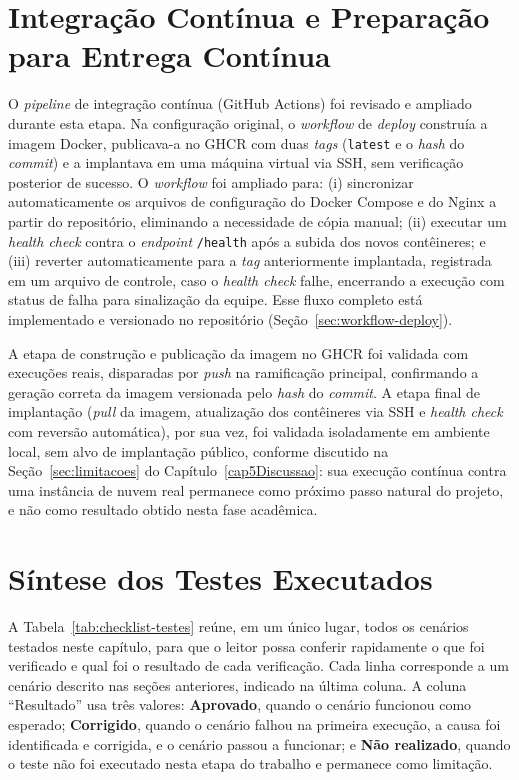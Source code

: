\section{Integração Contínua e Preparação para Entrega Contínua}
\label{sec:ci-cd-resultados}

O \textit{pipeline} de integração contínua (GitHub Actions) foi revisado e ampliado durante esta etapa. Na configuração original, o \textit{workflow} de \textit{deploy} construía a imagem Docker, publicava-a no GHCR com duas \textit{tags} (\texttt{latest} e o \textit{hash} do \textit{commit}) e a implantava em uma máquina virtual via SSH, sem verificação posterior de sucesso. O \textit{workflow} foi ampliado para: (i) sincronizar automaticamente os arquivos de configuração do Docker Compose e do Nginx a partir do repositório, eliminando a necessidade de cópia manual; (ii) executar um \textit{health check} contra o \textit{endpoint} \texttt{/\allowbreak{}health} após a subida dos novos contêineres; e (iii) reverter automaticamente para a \textit{tag} anteriormente implantada, registrada em um arquivo de controle, caso o \textit{health check} falhe, encerrando a execução com status de falha para sinalização da equipe. Esse fluxo completo está implementado e versionado no repositório (Seção~\ref{sec:workflow-deploy}).

A etapa de construção e publicação da imagem no GHCR foi validada com execuções reais, disparadas por \textit{push} na ramificação principal, confirmando a geração correta da imagem versionada pelo \textit{hash} do \textit{commit}. A etapa final de implantação (\textit{pull} da imagem, atualização dos contêineres via SSH e \textit{health check} com reversão automática), por sua vez, foi validada isoladamente em ambiente local, sem alvo de implantação público, conforme discutido na Seção~\ref{sec:limitacoes} do Capítulo~\ref{cap5Discussao}: sua execução contínua contra uma instância de nuvem real permanece como próximo passo natural do projeto, e não como resultado obtido nesta fase acadêmica.


\section{Síntese dos Testes Executados}
\label{sec:checklist-testes}

A Tabela~\ref{tab:checklist-testes} reúne, em um único lugar, todos os cenários testados neste capítulo, para que o leitor possa conferir rapidamente o que foi verificado e qual foi o resultado de cada verificação. Cada linha corresponde a um cenário descrito nas seções anteriores, indicado na última coluna. A coluna ``Resultado'' usa três valores: \textbf{Aprovado}, quando o cenário funcionou como esperado; \textbf{Corrigido}, quando o cenário falhou na primeira execução, a causa foi identificada e corrigida, e o cenário passou a funcionar; e \textbf{Não realizado}, quando o teste não foi executado nesta etapa do trabalho e permanece como limitação.

